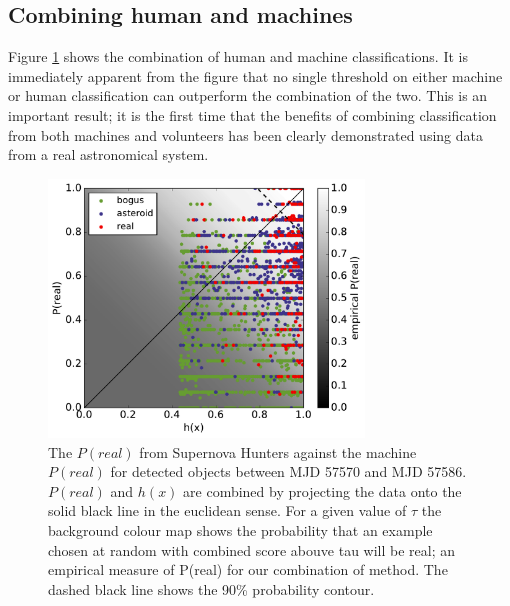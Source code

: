 \documentclass[a4paper,fleqn,usenatbib]{mnras}
\begin{document}
\subsection{Combining human and machines} 

Figure \ref{fig:combo_train} shows the combination of human and machine classifications. It is immediately apparent from the figure that no single threshold on either machine or human classification can outperform the combination of the two. This is an important result; it is the first time that the benefits of combining classification from both machines and volunteers has been clearly demonstrated using data from a real astronomical system. 

\begin{figure}
   \includegraphics[width=84mm]{figs/human_v_machine_20160712-20160718.pdf}
   \caption{The $P(real)$ from Supernova Hunters against the machine $P(real)$ for detected 
            objects between MJD 57570 and MJD 57586.  $P(real)$ and $h(x)$ are combined by projecting the data onto 
             the solid black line in the euclidean sense.  For a given value of $\tau$ the background colour map
            shows the probability that an example chosen at random with combined score abouve tau will be real; an
            empirical measure of P(real) for our combination of method.  The dashed black line shows the 90\% probability contour.}
   \label{fig:combo_train} 
\end{figure}


\end{document}
